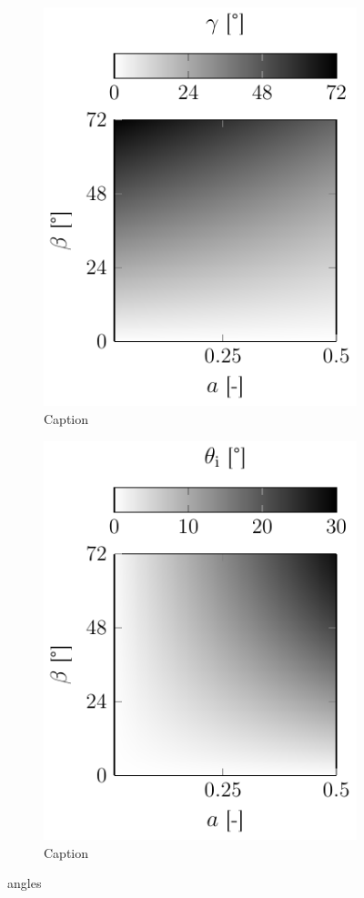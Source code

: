 \lipsum[1-5]

\begin{figure}
  \centering
  \begin{subfigure}[b]{0.45\textwidth}
    \centering
    \includegraphics[]{Plots/cache/gamma.pdf}
    \caption{Caption}
    \label{fig:T_gamma}
  \end{subfigure}
  \hfill
  \begin{subfigure}[b]{0.45\textwidth}
    \centering
    \includegraphics[]{Plots/cache/theta_i.pdf}
    \caption{Caption}
    \label{fig:T_theta_i}
  \end{subfigure}
  \caption{angles}
  \label{fig:T_gamma_theta}
\end{figure}

